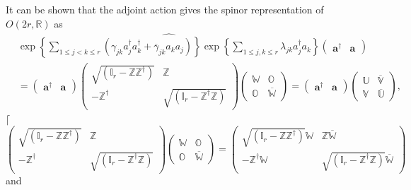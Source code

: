 \documentclass[aps, preprint]{revtex4}
\begin{document}
It can be shown that the adjoint action gives the spinor representation of $O \left (2 r ,\mathbb{R}\right )$ as
\begin{align} & \widehat{\exp  \left \{\sum _{1 \leq j <k \leq r}\left (\gamma _{j k} a_{j}^{ \dag } a_{k}^{ \dag } +\overline{\gamma }_{j k} a_{k} a_{j}\right )\right \} \exp  \left \{\sum _{1 \leq j ,k \leq r}\lambda _{j k} a_{j}^{ \dag } a_{k}\right \}} \left (\begin{array}{cc}\mathbf{a}^{ \dag } & \mathbf{a}\end{array}\right ) \\
 &  =\left (\begin{array}{cc}\mathbf{a}^{ \dag } & \mathbf{a}\end{array}\right ) \left (\begin{array}{cc}\sqrt{\left (\mathbb{I}_{r} -\mathbb{Z} \mathbb{Z}^{ \dag }\right )} & \mathbb{Z} \\
 -\mathbb{Z}^{ \dag } & \sqrt{\left (\mathbb{I}_{r} -\mathbb{Z}^{ \dag } \mathbb{Z}\right )}\end{array}\right ) \left (\begin{array}{cc}\mathbb{W} & \mathbb{O} \\
\mathbb{O} & \overline{\mathbb{W}}\end{array}\right ) =\left (\begin{array}{cc}\mathbf{a}^{ \dag } & \mathbf{a}\end{array}\right ) \left (\begin{array}{cc}\mathbb{U} & \overline{\mathbb{V}} \\
\mathbb{V} & \overline{\mathbb{U}}\end{array}\right )\text{,}\end{align}$\lceil $
\begin{equation}\left (\begin{array}{cc}\sqrt{\left (\mathbb{I}_{r} -\mathbb{Z} \mathbb{Z}^{ \dag }\right )} & \mathbb{Z} \\
 -\mathbb{Z}^{ \dag } & \sqrt{\left (\mathbb{I}_{r} -\mathbb{Z}^{ \dag } \mathbb{Z}\right )}\end{array}\right ) \left (\begin{array}{cc}\mathbb{W} & \mathbb{O} \\
\mathbb{O} & \overline{\mathbb{W}}\end{array}\right ) =\left (\begin{array}{cc}\sqrt{\left (\mathbb{I}_{r} -\mathbb{Z} \mathbb{Z}^{ \dag }\right )} \mathbb{W} & \mathbb{Z} \overline{\mathbb{W}} \\
 -\mathbb{Z}^{ \dag } \mathbb{W} & \sqrt{\left (\mathbb{I}_{r} -\mathbb{Z}^{ \dag } \mathbb{Z}\right )} \overline{\mathbb{W}}\end{array}\right )
\end{equation}and
\end{document}
